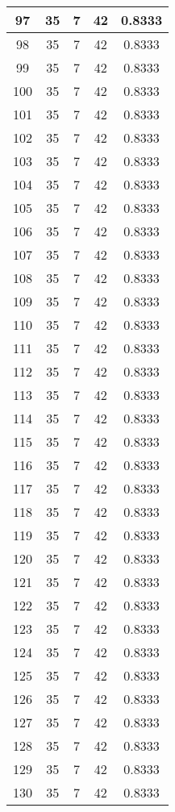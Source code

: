 \documentclass[letterpaper, 12pt]{article}
\begin{document}
\begin{longtable}{|c|c|c|c|c|}
\hline
97 & 35 & 7 & 42 & 0.8333 \\
\hline
98 & 35 & 7 & 42 & 0.8333 \\
\hline
99 & 35 & 7 & 42 & 0.8333 \\
\hline
100 & 35 & 7 & 42 & 0.8333 \\
\hline
101 & 35 & 7 & 42 & 0.8333 \\
\hline
102 & 35 & 7 & 42 & 0.8333 \\
\hline
103 & 35 & 7 & 42 & 0.8333 \\
\hline
104 & 35 & 7 & 42 & 0.8333 \\
\hline
105 & 35 & 7 & 42 & 0.8333 \\
\hline
106 & 35 & 7 & 42 & 0.8333 \\
\hline
107 & 35 & 7 & 42 & 0.8333 \\
\hline
108 & 35 & 7 & 42 & 0.8333 \\
\hline
109 & 35 & 7 & 42 & 0.8333 \\
\hline
110 & 35 & 7 & 42 & 0.8333 \\
\hline
111 & 35 & 7 & 42 & 0.8333 \\
\hline
112 & 35 & 7 & 42 & 0.8333 \\
\hline
113 & 35 & 7 & 42 & 0.8333 \\
\hline
114 & 35 & 7 & 42 & 0.8333 \\
\hline
115 & 35 & 7 & 42 & 0.8333 \\
\hline
116 & 35 & 7 & 42 & 0.8333 \\
\hline
117 & 35 & 7 & 42 & 0.8333 \\
\hline
118 & 35 & 7 & 42 & 0.8333 \\
\hline
119 & 35 & 7 & 42 & 0.8333 \\
\hline
120 & 35 & 7 & 42 & 0.8333 \\
\hline
121 & 35 & 7 & 42 & 0.8333 \\
\hline
122 & 35 & 7 & 42 & 0.8333 \\
\hline
123 & 35 & 7 & 42 & 0.8333 \\
\hline
124 & 35 & 7 & 42 & 0.8333 \\
\hline
125 & 35 & 7 & 42 & 0.8333 \\
\hline
126 & 35 & 7 & 42 & 0.8333 \\
\hline
127 & 35 & 7 & 42 & 0.8333 \\
\hline
128 & 35 & 7 & 42 & 0.8333 \\
\hline
129 & 35 & 7 & 42 & 0.8333 \\
\hline
130 & 35 & 7 & 42 & 0.8333 \\

\end{longtable}
\end{document}
